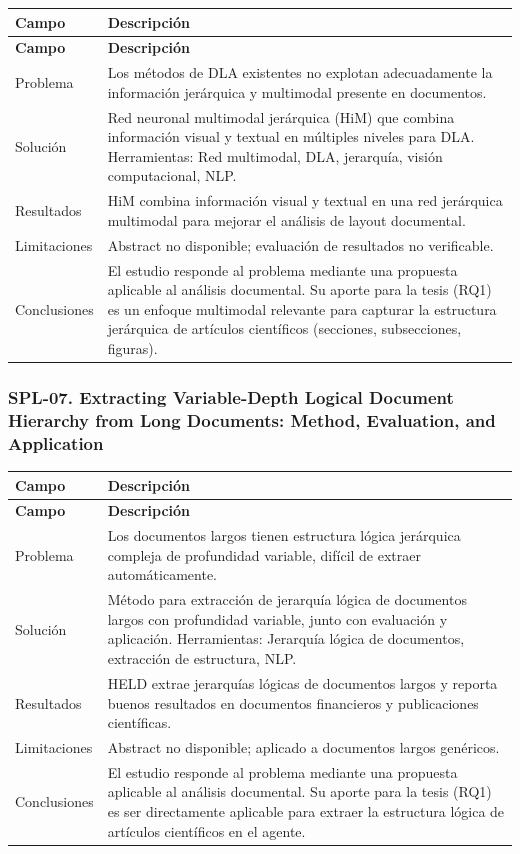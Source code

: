 \begin{longtable}{@{}>{\raggedright\arraybackslash}p{}>{\raggedright\arraybackslash}p{}@{}}
\toprule
\textbf{Campo} & \textbf{Descripción} \\
\midrule
\endfirsthead
\toprule
\textbf{Campo} & \textbf{Descripción} \\
\midrule
\endhead
\bottomrule
\endfoot
\endlastfoot
Problema & Los métodos de DLA existentes no explotan adecuadamente la información jerárquica y multimodal presente en documentos. \\
Solución & Red neuronal multimodal jerárquica (HiM) que combina información visual y textual en múltiples niveles para DLA. Herramientas: Red multimodal, DLA, jerarquía, visión computacional, NLP. \\
Resultados & HiM combina información visual y textual en una red jerárquica multimodal para mejorar el análisis de layout documental. \\
Limitaciones & Abstract no disponible; evaluación de resultados no verificable. \\
Conclusiones & El estudio responde al problema mediante una propuesta aplicable al análisis documental. Su aporte para la tesis (RQ1) es un enfoque multimodal relevante para capturar la estructura jerárquica de artículos científicos (secciones, subsecciones, figuras). \\
\end{longtable}

\subsubsection*{SPL-07. Extracting Variable-Depth Logical Document Hierarchy from Long Documents: Method, Evaluation, and Application}

\begin{longtable}{@{}>{\raggedright\arraybackslash}p{}>{\raggedright\arraybackslash}p{}@{}}
\toprule
\textbf{Campo} & \textbf{Descripción} \\
\midrule
\endfirsthead
\toprule
\textbf{Campo} & \textbf{Descripción} \\
\midrule
\endhead
\bottomrule
\endfoot
\endlastfoot
Problema & Los documentos largos tienen estructura lógica jerárquica compleja de profundidad variable, difícil de extraer automáticamente. \\
Solución & Método para extracción de jerarquía lógica de documentos largos con profundidad variable, junto con evaluación y aplicación. Herramientas: Jerarquía lógica de documentos, extracción de estructura, NLP. \\
Resultados & HELD extrae jerarquías lógicas de documentos largos y reporta buenos resultados en documentos financieros y publicaciones científicas. \\
Limitaciones & Abstract no disponible; aplicado a documentos largos genéricos. \\
Conclusiones & El estudio responde al problema mediante una propuesta aplicable al análisis documental. Su aporte para la tesis (RQ1) es ser directamente aplicable para extraer la estructura lógica de artículos científicos en el agente. \\
\end{longtable}
